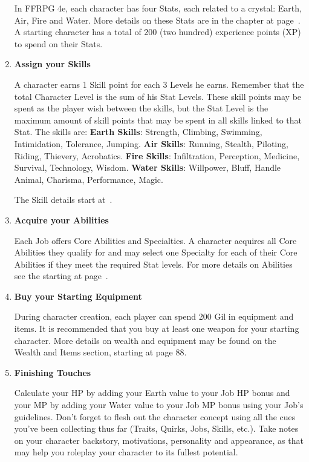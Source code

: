 \begin{multicols}{2}
\begin{enumerate}
In FFRPG 4e, each character has four Stats, each related to a crystal: Earth, Air, Fire and Water. More details on these Stats are in the  chapter at page~\pageref{subsec:stats}. A starting character has a total of 200 (two hundred) experience points (XP) to spend on their Stats. 

\item \textbf{Assign your Skills}

A character earns 1 Skill point for each 3 Levels he earns. Remember that the total Character Level is the sum of his Stat Levels. These skill points may be spent as the player wish between the skills, but the Stat Level is the maximum amount of skill points that may be spent in all skills linked to that Stat. The skills are:
\textbf{Earth Skills}: Strength, Climbing, Swimming, Intimidation, Tolerance, Jumping.
\textbf{Air Skills}: Running, Stealth, Piloting, Riding, Thievery, Acrobatics.
\textbf{Fire Skills}: Infiltration, Perception, Medicine, Survival, Technology, Wisdom.
\textbf{Water Skills}: Willpower, Bluff, Handle Animal, Charisma, Performance, Magic.

The Skill details start at~\pageref{subsec:skills}.

\item \textbf{Acquire your Abilities}

Each Job offers Core Abilities and Specialties. A character acquires all Core Abilities they qualify for and may select one Specialty for each of their Core Abilities if they meet the required Stat levels. For more details on Abilities see the  starting at page~\pageref{sec:combat}. 

\item \textbf{Buy your Starting Equipment}

During character creation, each player can spend 200 Gil in equipment and items. It is recommended that you buy at least one weapon for your starting character. More details on wealth and equipment may be found on the Wealth and Items section, starting at page 88.

\item \textbf{Finishing Touches}

Calculate your HP by adding your Earth value to your Job HP bonus and your MP by adding your Water value to your Job MP bonus using your Job's guidelines. Don't forget to flesh out the character concept using all the cues you've been collecting thus far (Traits, Quirks, Jobs, Skills, etc.). Take notes on your character backstory, motivations, personality and appearance, as that may help you roleplay your character to its fullest potential.


\end{enumerate}
\end{multicols}
